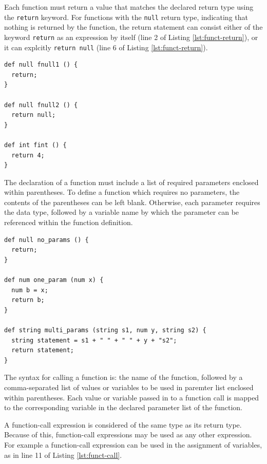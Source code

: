 \documentclass{article}
\newcommand{\code}[1]{\texttt{#1}} %
\begin{document}

Each function must return a value that matches the declared return type using the \code{return} keyword. For functions with the \code{null} return type, indicating that nothing is returned by the function, the return statement can consist either of the keyword \code{return} as an expression by itself (line 2 of Listing \ref{lst:funct-return}), or it can explcitly \code{return null} (line 6 of Listing \ref{lst:funct-return}).

\begin{lstlisting}[language=pltLang, caption=Return statements of functions., label=lst:funct-return]
def null fnull1 () {
  return;
}

def null fnull2 () {
  return null;
}

def int fint () {
  return 4;
}
\end{lstlisting}


The declaration of a function must include a list of required parameters enclosed within parentheses. To define a function which requires no parameters, the contents of the parentheses can be left blank. Otherwise, each parameter requires the data type, followed by a variable name by which the parameter can be referenced within the function definition. 

\begin{lstlisting}[language=pltLang, caption=Parameters in function declarations., label=lst:funct-params]
def null no_params () {
  return;
}

def num one_param (num x) {
  num b = x;
  return b;
}

def string multi_params (string s1, num y, string s2) {
  string statement = s1 + " " + " " + y + "s2";
  return statement;
}

\end{lstlisting}


The syntax for calling a function is: the name of the function, followed by a comma-separated list of values or variables to be used in paremter list enclosed within parentheses. Each value or variable passed in to a function call is mapped to the corresponding variable in the declared parameter list of the function.

A function-call expression is considered of the same type as its return type. Because of this, function-call expressions may be used as any other expression. For example a function-call expression can be used in the assignment of variables, as in line 11 of Listing \ref{lst:funct-call}.
\end{document}
